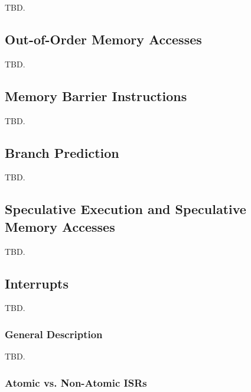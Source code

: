 TBD.


\subsection{Out-of-Order Memory Accesses}
\label{scfp0:soom0}

TBD.


\subsection{Memory Barrier Instructions}
\label{scfp0:smbi0}

TBD.


\subsection{Branch Prediction}
\label{scfp0:sbpd0}

TBD.


\subsection{Speculative Execution and Speculative Memory Accesses}
\label{scfp0:sses0}

TBD.


\subsection{Interrupts}
\label{scfp0:sint0}

TBD.


\subsubsection{General Description}
\label{scfp0:sint0:sovr0}

TBD.


\subsubsection{Atomic vs. Non-Atomic ISRs}
\label{scfp0:sint0:sana0}


